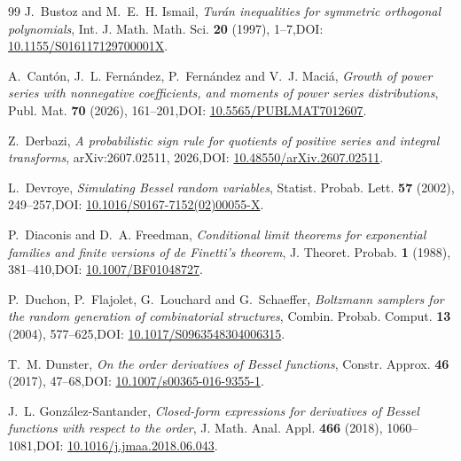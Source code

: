 \documentclass[11pt,a4paper]{amsart}
\numberwithin{equation}{section}
\theoremstyle{plain}
\theoremstyle{definition}
\begin{document}
\begin{thebibliography}{99}
J.~Bustoz and M.~E.~H. Ismail,
\emph{Tur\'{a}n inequalities for symmetric orthogonal polynomials},
Int. J. Math. Math. Sci. \textbf{20} (1997), 1--7,\newline DOI: \href{https://doi.org/10.1155/S016117129700001X}{10.1155/S016117129700001X}.


A.~Cant\'on, J.~L. Fern\'andez, P.~Fern\'andez and V.~J. Maci\'a,
\emph{Growth of power series with nonnegative coefficients, and moments of power series distributions},
Publ. Mat. \textbf{70} (2026), 161--201,\newline DOI: \href{https://doi.org/10.5565/PUBLMAT7012607}{10.5565/PUBLMAT7012607}.

Z.~Derbazi,
\emph{A probabilistic sign rule for quotients of positive series and integral transforms},
arXiv:2607.02511, 2026,\newline DOI: \href{https://doi.org/10.48550/arXiv.2607.02511}{10.48550/arXiv.2607.02511}.

L.~Devroye,
\emph{Simulating Bessel random variables},
Statist. Probab. Lett. \textbf{57} (2002), 249--257,\newline DOI: \href{https://doi.org/10.1016/S0167-7152(02)00055-X}{10.1016/S0167-7152(02)00055-X}.

P.~Diaconis and D.~A. Freedman,
\emph{Conditional limit theorems for exponential families and finite versions of de Finetti's theorem},
J. Theoret. Probab. \textbf{1} (1988), 381--410,\newline DOI: \href{https://doi.org/10.1007/BF01048727}{10.1007/BF01048727}.

P.~Duchon, P.~Flajolet, G.~Louchard and G.~Schaeffer,
\emph{Boltzmann samplers for the random generation of combinatorial structures},
Combin. Probab. Comput. \textbf{13} (2004), 577--625,\newline DOI: \href{https://doi.org/10.1017/S0963548304006315}{10.1017/S0963548304006315}.

T.~M. Dunster,
\emph{On the order derivatives of Bessel functions},
Constr. Approx. \textbf{46} (2017), 47--68,\newline DOI: \href{https://doi.org/10.1007/s00365-016-9355-1}{10.1007/s00365-016-9355-1}.

J.~L. Gonz\'alez-Santander,
\emph{Closed-form expressions for derivatives of Bessel functions with respect to the order},
J. Math. Anal. Appl. \textbf{466} (2018), 1060--1081,\newline DOI: \href{https://doi.org/10.1016/j.jmaa.2018.06.043}{10.1016/j.jmaa.2018.06.043}.


\end{thebibliography}
\end{document}
